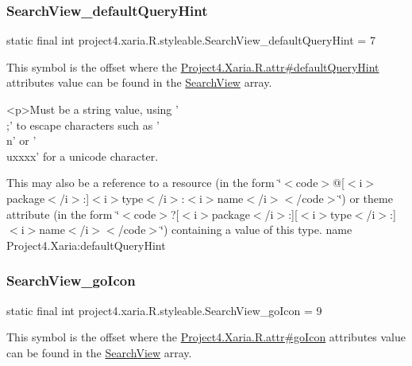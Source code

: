 \subsubsection{\texorpdfstring{Search\+View\+\_\+default\+Query\+Hint}{SearchView\_defaultQueryHint}}
{\footnotesize\ttfamily static final int project4.\+xaria.\+R.\+styleable.\+Search\+View\+\_\+default\+Query\+Hint = 7\hspace{0.3cm}{\ttfamily [static]}}

This symbol is the offset where the \hyperlink{}{Project4.\+Xaria.\+R.\+attr\#default\+Query\+Hint} attribute\textquotesingle{}s value can be found in the \hyperlink{classproject4_1_1xaria_1_1R_1_1styleable_a6308d960f6e1e05e5316efa4904fedfc}{Search\+View} array.

\begin{DoxyVerb}      <p>Must be a string value, using '\\;' to escape characters such as '\\n' or '\\uxxxx' for a unicode character.
\end{DoxyVerb}
 

This may also be a reference to a resource (in the form \char`\"{}$<$code$>$@\mbox{[}$<$i$>$package$<$/i$>$\+:\mbox{]}$<$i$>$type$<$/i$>$\+:$<$i$>$name$<$/i$>$$<$/code$>$\char`\"{}) or theme attribute (in the form \char`\"{}$<$code$>$?\mbox{[}$<$i$>$package$<$/i$>$\+:\mbox{]}\mbox{[}$<$i$>$type$<$/i$>$\+:\mbox{]}$<$i$>$name$<$/i$>$$<$/code$>$\char`\"{}) containing a value of this type.  name Project4.\+Xaria\+:default\+Query\+Hint \mbox{\label{classproject4_1_1xaria_1_1R_1_1styleable_a722e570aa508bd7cec45f03da9ac5f29}} 
\subsubsection{\texorpdfstring{Search\+View\+\_\+go\+Icon}{SearchView\_goIcon}}
{\footnotesize\ttfamily static final int project4.\+xaria.\+R.\+styleable.\+Search\+View\+\_\+go\+Icon = 9\hspace{0.3cm}{\ttfamily [static]}}

This symbol is the offset where the \hyperlink{}{Project4.\+Xaria.\+R.\+attr\#go\+Icon} attribute\textquotesingle{}s value can be found in the \hyperlink{classproject4_1_1xaria_1_1R_1_1styleable_a6308d960f6e1e05e5316efa4904fedfc}{Search\+View} array.


